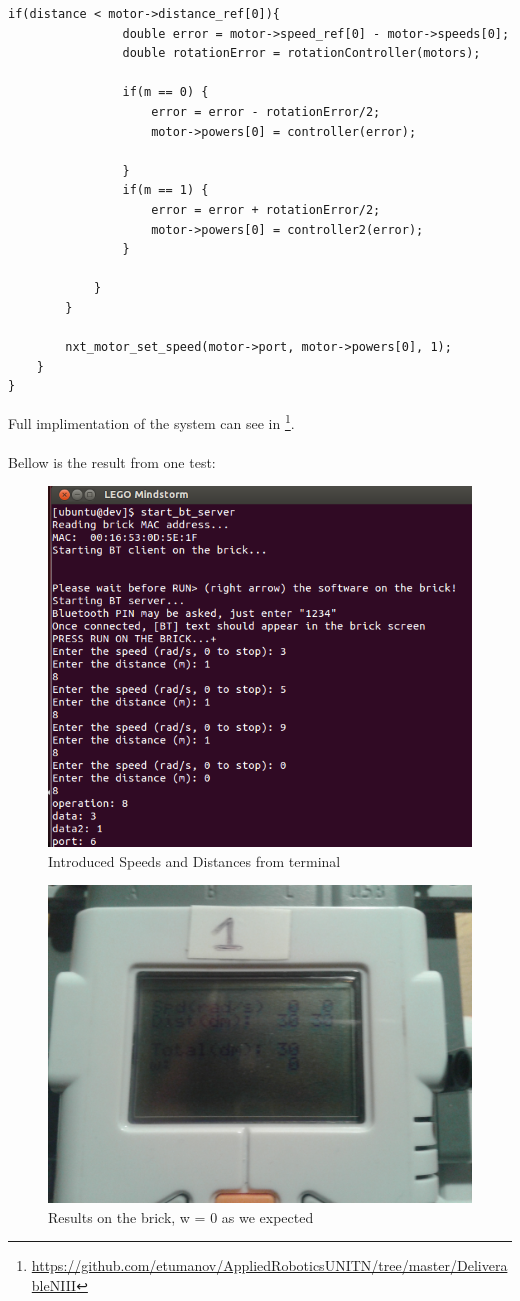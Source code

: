 \documentclass[a4paper,12pt,oneside]{article}
\begin{document}
\begin{enumerate}
\begin{lstlisting}[frame=single]
			if(distance < motor->distance_ref[0]){
				double error = motor->speed_ref[0] - motor->speeds[0];
				double rotationError = rotationController(motors);

				if(m == 0) {
					error = error - rotationError/2;
					motor->powers[0] = controller(error);

				}
				if(m == 1) {
					error = error + rotationError/2;
					motor->powers[0] = controller2(error);
				}

			}
		}
		
		nxt_motor_set_speed(motor->port, motor->powers[0], 1);
	}
}
\end{lstlisting}

Full implimentation of the system can see in \footnote{\url{https://github.com/etumanov/AppliedRoboticsUNITN/tree/master/DeliverableNIII}}. \\ 

\\Bellow is the result from one test: \\

\begin{figure} [h]%
	\centering
	\includegraphics[width=10 cm]{finaltest.png}
	\caption{Introduced Speeds and Distances from terminal} %
\end{figure}

\begin{figure} [h]%
	\centering
	\includegraphics[width=7 cm]{brick1.jpg} 
	\caption{Results on the brick, w = 0 as we expected} %
\end{figure}


\end{enumerate}
\end{document}
